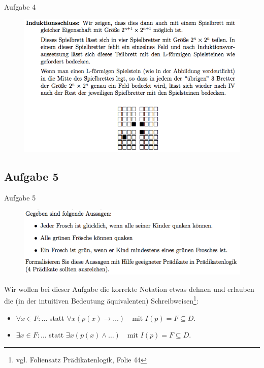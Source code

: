 \begin{frame}{Aufgabe 4}
\begin{figure}[h!]
		\centering
		\includegraphics[width=\textwidth]{../topics/weihnachtstut-aufgaben/10.png} 
	\end{figure}    
\end{frame}

\subsection{Aufgabe 5}
\begin{frame}{Aufgabe 5}
\begin{figure}[h!]
		\centering
		\includegraphics[width=\textwidth]{../topics/weihnachtstut-aufgaben/11.png} 
	\end{figure}     

	Wir wollen bei dieser Aufgabe die korrekte Notation etwas dehnen und erlauben die (in der intuitiven Bedeutung äquivalenten) Schreibweisen\footnote{vgl. Foliensatz Prädikatenlogik, Folie 44}:
	\begin{itemize}
		\item $\forall x \in F: \dots$ \quad statt \quad $\forall x (p(x) \rightarrow \dots) \quad \text{mit } I(p) = F \subseteq D.$
		\item $\exists x \in F: \dots$ \quad statt \quad $\exists x (p(x) \wedge \dots) \quad \text{mit } I(p) = F \subseteq D.$
	\end{itemize}

\end{frame}

